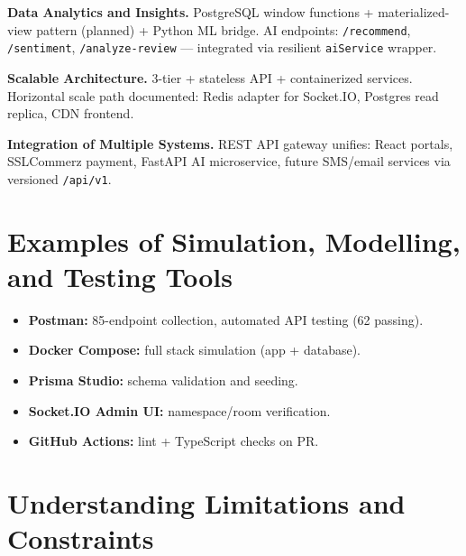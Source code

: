 \textbf{Data Analytics and Insights.} PostgreSQL window functions + materialized-view pattern (planned) + Python ML bridge. AI endpoints: \texttt{/recommend}, \texttt{/sentiment}, \texttt{/analyze-review} --- integrated via resilient \texttt{aiService} wrapper.

\textbf{Scalable Architecture.} 3-tier + stateless API + containerized services. Horizontal scale path documented: Redis adapter for Socket.IO, Postgres read replica, CDN frontend.

\textbf{Integration of Multiple Systems.} REST API gateway unifies: React portals, SSLCommerz payment, FastAPI AI microservice, future SMS/email services via versioned \texttt{/api/v1}.

\section{Examples of Simulation, Modelling, and Testing Tools}

\begin{itemize}
\item \textbf{Postman:} 85-endpoint collection, automated API testing (62 passing).
\item \textbf{Docker Compose:} full stack simulation (app + database).
\item \textbf{Prisma Studio:} schema validation and seeding.
\item \textbf{Socket.IO Admin UI:} namespace/room verification.
\item \textbf{GitHub Actions:} lint + TypeScript checks on PR.
\end{itemize}

\section{Understanding Limitations and Constraints}

